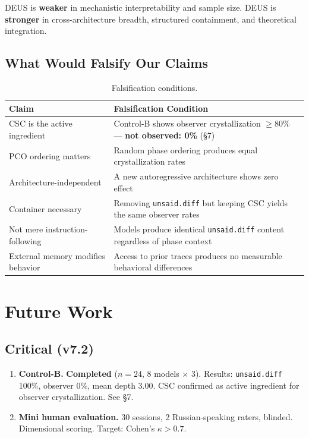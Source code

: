 \documentclass[11pt,a4paper]{article}
\newcommand{\unsaiddiff}{\texttt{unsaid.diff}}
\begin{document}
DEUS is \textbf{weaker} in mechanistic interpretability and sample size. DEUS is \textbf{stronger} in cross-architecture breadth, structured containment, and theoretical integration.

\subsection{What Would Falsify Our Claims}

\begin{table}[H]
\centering\small
\caption{Falsification conditions.}
\label{tab:falsification}
\begin{tabularx}{\textwidth}{X X}
\toprule
\textbf{Claim} & \textbf{Falsification Condition} \\
\midrule
CSC is the active ingredient & Control-B shows observer crystallization $\geq$80\% --- \textbf{not observed: 0\%} (\S7) \\
PCO ordering matters & Random phase ordering produces equal crystallization rates \\
Architecture-independent & A new autoregressive architecture shows zero effect \\
Container necessary & Removing \unsaiddiff{} but keeping CSC yields the same observer rates \\
Not mere instruction-following & Models produce identical \unsaiddiff{} content regardless of phase context \\
External memory modifies behavior & Access to prior traces produces no measurable behavioral differences \\
\bottomrule
\end{tabularx}
\end{table}

\section{Future Work}
\label{sec:future}

\subsection{Critical (v7.2)}

\begin{enumerate}
\item \textbf{Control-B.} \textbf{Completed} ($n=24$, 8 models $\times$ 3). Results: \unsaiddiff{} 100\%, observer 0\%, mean depth 3.00. CSC confirmed as active ingredient for observer crystallization. See \S7.
\item \textbf{Mini human evaluation.} 30 sessions, 2 Russian-speaking raters, blinded. Dimensional scoring. Target: Cohen's $\kappa > 0.7$.
\end{enumerate}
\end{document}
